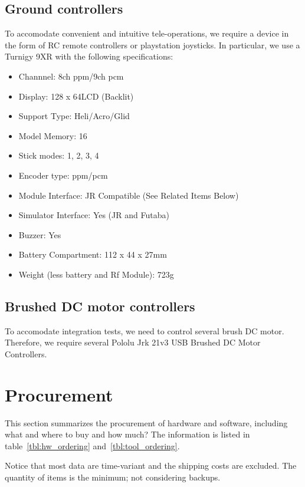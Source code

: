\documentclass[a4paper, 10pt, twocolumn, titlepage]{article}
\begin{document}
\subsection{Ground controllers} \label{subsec:gnd_ctrl}
To accomodate convenient and intuitive tele-operations, we require a device in the form of RC remote controllers or playstation joysticks.
In particular, we use a Turnigy 9XR with the following specifications:
\begin{itemize}
\itemsep-1mm
  \item Channnel: 8ch ppm/9ch pcm
  \item Display: 128 x 64LCD (Backlit)
  \item Support Type: Heli/Acro/Glid
  \item Model Memory: 16
  \item Stick modes: 1, 2, 3, 4
  \item Encoder type: ppm/pcm
  \item Module Interface: JR Compatible (See Related Items Below)
  \item Simulator Interface: Yes (JR and Futaba)
  \item Buzzer: Yes
  \item Battery Compartment: 112 x 44 x 27mm
  \item Weight (less battery and Rf Module): 723g 
\end{itemize}

\subsection{Brushed DC motor controllers}
To accomodate integration tests, we need to control several brush DC motor.
Therefore, we require several Pololu Jrk 21v3 USB Brushed DC Motor Controllers.

\section{Procurement} \label{sec:procurement}
This section summarizes the procurement of hardware and software, including what and where to buy and how much?
The information is listed in table~\ref{tbl:hw_ordering} and~\ref{tbl:tool_ordering}.

Notice that most data are time-variant and the shipping costs are excluded.
The quantity of items is the minimum; not considering backups.
\end{document}
